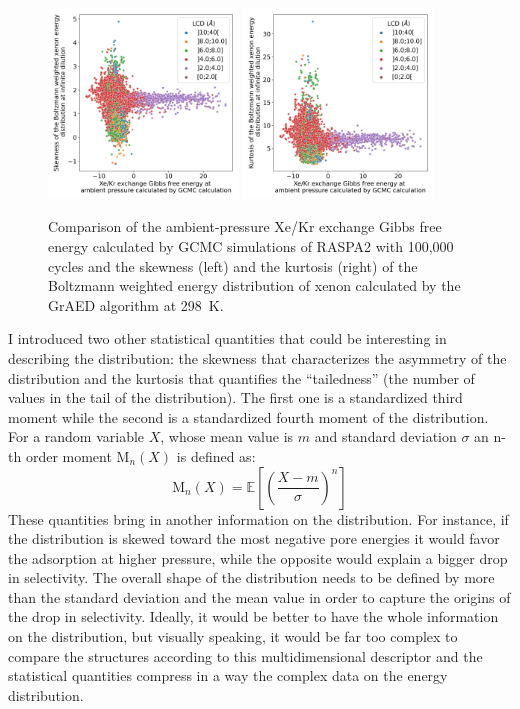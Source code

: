 \documentclass[main]{subfiles}
\begin{document}
\begin{figure}[ht]
  \centering
    \includegraphics[width=0.45\textwidth]{figures/3-fastsim/G_2080_vs_enthalpy_skew_overview.jpg}
    \includegraphics[width=0.45\textwidth]{figures/3-fastsim/G_2080_vs_enthalpy_kurt_overview.jpg}
    \caption{Comparison of the ambient-pressure Xe/Kr exchange Gibbs free energy calculated by GCMC simulations of RASPA2 with 100,000 cycles and the skewness (left) and the kurtosis (right) of the Boltzmann weighted energy distribution of xenon calculated by the GrAED algorithm at \SI{298}{\kelvin}.}\label{fgr:enthalpy_skew_kurt}
\end{figure}

I introduced two other statistical quantities that could be interesting in describing the distribution: the skewness that characterizes the asymmetry of the distribution and the kurtosis that quantifies the ``tailedness'' (the number of values in the tail of the distribution). The first one is a standardized third moment while the second is a standardized fourth moment of the distribution. For a random variable $X$, whose mean value is $m$ and standard deviation $\sigma$ an n-th order moment $\text{M}_{n}(X)$ is defined as:
\begin{equation}
  \text{M}_n(X) = \mathbb{E}\left[{\left(\dfrac{X-m}{\sigma}\right)}^n\right]
\end{equation}
These quantities bring in another information on the distribution. For instance, if the distribution is skewed toward the most negative pore energies it would favor the adsorption at higher pressure, while the opposite would explain a bigger drop in selectivity. The overall shape of the distribution needs to be defined by more than the standard deviation and the mean value in order to capture the origins of the drop in selectivity. Ideally, it would be better to have the whole information on the distribution, but visually speaking, it would be far too complex to compare the structures according to this multidimensional descriptor and the statistical quantities compress in a way the complex data on the energy distribution.
\end{document}
